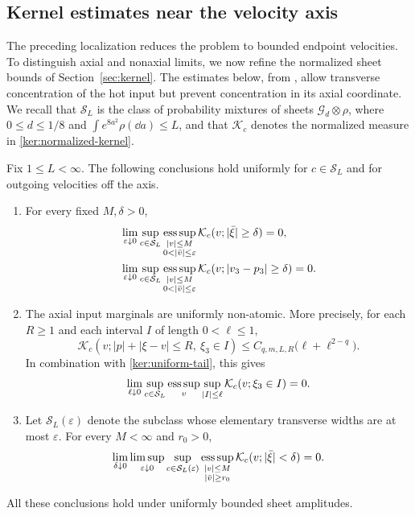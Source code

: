 \subsection{Kernel estimates near the velocity axis}

The preceding localization reduces the problem to bounded endpoint
velocities. To distinguish axial and nonaxial limits, we now refine
the normalized sheet bounds of Section~\ref{sec:kernel}. The estimates
below, from \cite[Section~3]{OpenAIPeriodic}, allow transverse
concentration of the hot input but prevent concentration in its axial
coordinate. We recall that $\mathcal S_L$ is the class of probability
mixtures of sheets $\mathcal G_d\otimes\rho$, where
$0\leq d\leq1/8$ and $\int e^{8a^2}\rho(\dd a)\leq L$, and that
$\mathcal K_c$ denotes the normalized measure in
\eqref{ker:normalized-kernel}.

\begin{lemma}
\label{lem:axis-kernel-estimates}
Fix $1\leq L<\infty$. The following conclusions hold uniformly for
$c\in\mathcal S_L$ and for outgoing velocities off the axis.
\begin{enumerate}[label=\textup{(\roman*)}]
\item For every fixed $M,\delta>0$,
\begin{align}
 &\lim_{\varepsilon\downarrow0}
 \sup_{c\in\mathcal S_L}
 \esssup_{\substack{|v|\leq M\\0<|\bar v|\leq\varepsilon}}
 \mathcal K_c(v;|\bar\xi|\geq\delta)=0,
 \label{ker:axis-input}\\
 &\lim_{\varepsilon\downarrow0}
 \sup_{c\in\mathcal S_L}
 \esssup_{\substack{|v|\leq M\\0<|\bar v|\leq\varepsilon}}
 \mathcal K_c(v;|v_3-p_3|\geq\delta)=0.
 \label{ker:axis-mismatch}
\end{align}
\item The axial input marginals are uniformly non-atomic. More
precisely, for each $R\geq1$ and each interval $I$ of length
$0<\ell\leq1$,
\begin{equation}\label{ker:axial-interval}
 \mathcal K_c(v;|p|+|\xi-v|\leq R,\ \xi_3\in I)
 \leq C_{q,m,L,R}\bigl(\ell+\ell^{2-q}\bigr).
\end{equation}
In combination with \eqref{ker:uniform-tail}, this gives
\begin{equation}\label{ker:axial-modulus}
 \lim_{\ell\downarrow0}\sup_{c\in\mathcal S_L}\operatorname*{ess\,sup}_v
 \sup_{|I|\leq\ell}\mathcal K_c(v;\xi_3\in I)=0.
\end{equation}
\item Let $\mathcal S_L(\varepsilon)$ denote the subclass whose
elementary transverse widths are at most $\varepsilon$. For every
$M<\infty$ and $r_0>0$,
\begin{equation}\label{ker:off-axis-small-input}
 \lim_{\delta\downarrow0}\limsup_{\varepsilon\downarrow0}
 \sup_{c\in\mathcal S_L(\varepsilon)}
 \operatorname*{ess\,sup}_{\substack{|v|\leq M\\|\bar v|\geq r_0}}
 \mathcal K_c(v;|\bar\xi|<\delta)=0.
\end{equation}
\end{enumerate}
All these conclusions hold under uniformly bounded sheet amplitudes.
\end{lemma}

